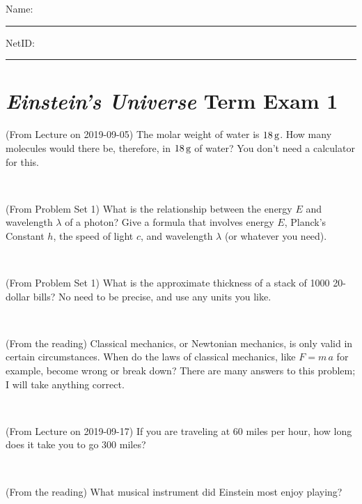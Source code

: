 \documentclass[12pt, letterpaper]{article}
\begin{document}
\noindent
Name: \rule[-1ex]{0.60\textwidth}{0.1pt}
NetID: \rule[-1ex]{0.20\textwidth}{0.1pt}

\section*{\textsl{Einstein's Universe} Term Exam 1}
\setcounter{problem}{1}


\begin{problem} (From Lecture on 2019-09-05)
The molar weight of water is $18\,\mathrm{g}$. How many molecules would there
be, therefore, in $18\,\mathrm{g}$ of water? You don't need a calculator for
this.
\end{problem}


\vfill ~

\begin{problem} (From Problem Set 1)
What is the relationship between the energy $E$ and wavelength
$\lambda$ of a photon? Give a formula that involves energy $E$,
Planck's Constant $h$, the speed of light $c$, and wavelength
$\lambda$ (or whatever you need).
\end{problem}

\vfill ~

\begin{problem} (From Problem Set 1)
What is the approximate thickness of a stack of 1000 20-dollar bills?
No need to be precise, and use any units you like.
\end{problem}


\vfill ~

\begin{problem} (From the reading)
Classical mechanics, or Newtonian mechanics, is only valid in certain
circumstances. When do the laws of classical mechanics, like $F =
m\,a$ for example, become wrong or break down? There are many answers
to this problem; I will take anything correct.
\end{problem}


\vfill ~


\clearpage


\begin{problem} (From Lecture on 2019-09-17)
If you are traveling at 60 miles per hour, how long does
it take you to go 300 miles?
\end{problem}


\vfill ~

\begin{problem} (From the reading)
What musical instrument did Einstein most enjoy playing?
\end{problem}
\end{document}
